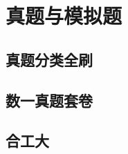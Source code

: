 \documentclass[12pt, a4paper, oneside, UTF8]{ctexbook}
\begin{document}
% 
\else
\fi
\chapter{真题与模拟题}

\section{真题分类全刷}

\section{数一真题套卷}

\section{合工大}
\ifx\allfiles\undefined
\end{document}
